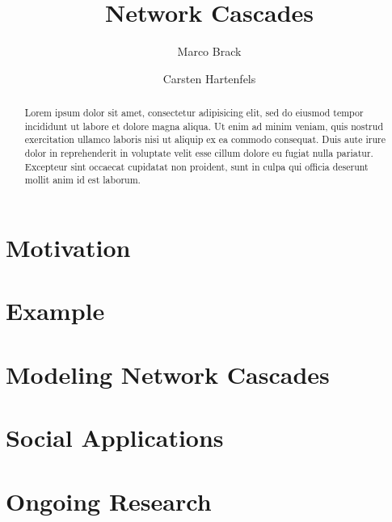 \documentclass{sig-alternate-05-2015}
\begin{document}
\title{Network Cascades}
\author{Marco Brack \and Carsten Hartenfels}
\maketitle

\begin{abstract}
  Lorem ipsum dolor sit amet, consectetur adipisicing elit, sed do eiusmod tempor incididunt ut labore et dolore magna aliqua. Ut enim ad minim veniam, quis nostrud exercitation ullamco laboris nisi ut aliquip ex ea commodo consequat. Duis aute irure dolor in reprehenderit in voluptate velit esse cillum dolore eu fugiat nulla pariatur. Excepteur sint occaecat cupidatat non proident, sunt in culpa qui officia deserunt mollit anim id est laborum. \cite{simplemodel}
\end{abstract}

\section{Motivation}

\section{Example}

\section{Modeling Network Cascades}

\section{Social Applications}

\section{Ongoing Research}



\end{document}
